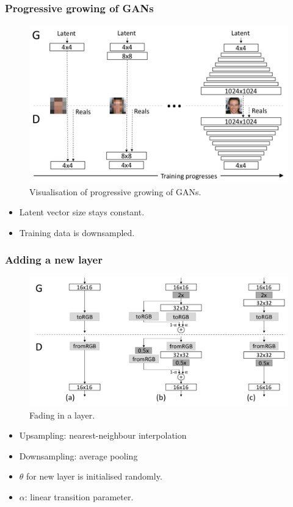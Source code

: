 \documentclass[xcolor=dvipsnames]{beamer}
\begin{document}
\begin{frame}
\frametitle{Progressive growing of GANs\cite{karras2017progressive}}
\begin{figure}
	\includegraphics[width=0.8\linewidth]{img/prog_GAN.png}
	\caption{Visualisation of progressive growing of GANs.}
\end{figure}
\begin{itemize}
\item Latent vector size stays constant.
\item Training data is downsampled.
\end{itemize}
\end{frame}



\begin{frame}
\frametitle{Adding a new layer}
\begin{figure}
	\includegraphics[width=0.8\linewidth]{img/prog_GAN_layer_add.png}
	\caption{Fading in a layer\cite{karras2017progressive}.}
\end{figure}
\begin{itemize}
	\item Upsampling: nearest-neighbour interpolation
	\item Downsampling: average pooling
	\item $\theta$ for new layer is initialised randomly.
	\item $\alpha$: linear transition parameter.
\end{itemize}
\end{frame}
\end{document}
